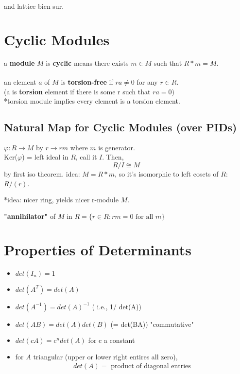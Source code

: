 \documentclass[12pt]{article}
\newcommand{\bt}[1]{\textbf{#1}} %
\newcommand{\eq}[1]{\begin{align*}#1\end{align*}} %
\newcommand{\gray}[1]{\textcolor[gray]{0.5}{#1}} %
\begin{document}
and lattice bien sur. 

\section*{Cyclic Modules}
a \bt{module} $M$ is \bt{cyclic} means there exists $m \in M$  such that $R*m = M$.\\
\ \\
an element $a$ of $M$ is \bt{torsion-free} if $r a \neq 0$ for any $r \in R$.\\
(a is \bt{torsion} element if there is some r such that $ra = 0$)\\

*torsion module implies every element is a torsion element.\\

\subsection*{Natural Map for Cyclic Modules (over PIDs)}
$\varphi: R \rightarrow M$ by $r \rightarrow r m$ where $m$ is generator.\\

Ker($\varphi$) = left ideal in $R$, call it $I$. 
Then, 
$$R / I \cong M$$
by first iso theorem. 
\gray{idea: $M = R*m$, so it's isomorphic to left cosets of $R$: $R / (r)$.}

*idea: nicer ring, yields nicer r-module $M$.

\bt{"annihilator"} of $M$ in $R = \{r \in R : r m = 0 \text{ for all } m\}$ 

\section*{Properties of Determinants}
\begin{itemize}
    \item $det(I_n) = 1$
    \item $det(A^T) = det(A)$
    \item $det(A^{-1}) = det(A)^{-1}$ ( i.e., 1/ det(A))
    \item $det(AB) = det(A)det(B)$ (= det(BA)) "commutative"
    \item $det(cA) = c^n det(A)$ for c a constant
    \item for $A$ triangular (upper or lower right entires all zero), \\
    \eq{det(A) = \text{ product of diagonal entries}}
\end{itemize}
\end{document}
